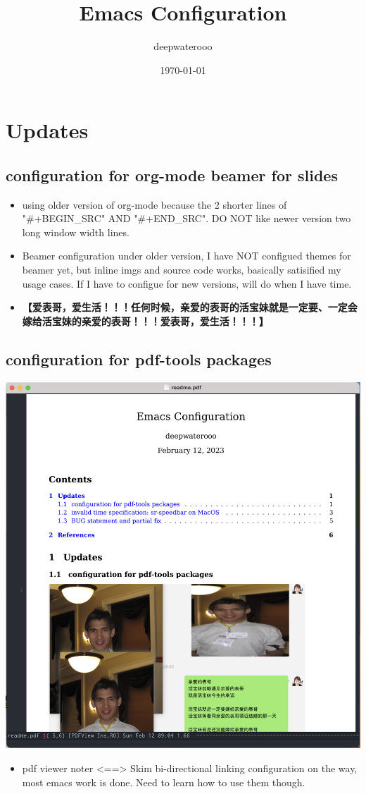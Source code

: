 \documentclass[9pt, b5paper]{article}
\author{deepwaterooo}
\date{\today}
\title{Emacs Configuration}
\begin{document}
\maketitle
\tableofcontents


\section{Updates}
\label{sec-1}
\subsection{configuration for org-mode beamer for slides}
\label{sec-1-1}
\begin{itemize}
\item using older version of org-mode because the 2 shorter lines of "\#+BEGIN\_SRC" AND "\#+END\_SRC". DO NOT like newer version two long window width lines.
\item Beamer configuration under older version, I have NOT configued themes for beamer yet, but inline imgs and source code works, basically satisified my usage cases. If I have to configue for new versions, will do when I have time.
\item \textbf{【爱表哥，爱生活！！！任何时候，亲爱的表哥的活宝妹就是一定要、一定会嫁给活宝妹的亲爱的表哥！！！爱表哥，爱生活！！！】}
\end{itemize}
\subsection{configuration for pdf-tools packages}
\label{sec-1-2}

\includegraphics[width=.9\linewidth]{./pic/mememe2.png}
\begin{itemize}
\item pdf viewer noter <==> Skim bi-directional linking configuration on the way, most emacs work is done. Need to learn how to use them though.
\end{itemize}
\end{document}
